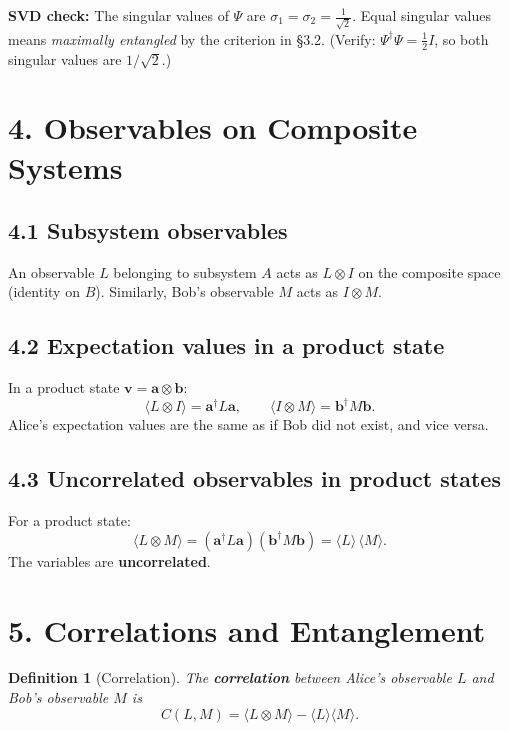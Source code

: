 \documentclass[12pt,a4paper]{article}
\newtheorem{definition}{Definition}
\begin{document}
\textbf{SVD check:}  The singular values of $\Psi$ are $\sigma_1 = \sigma_2 = \frac{1}{\sqrt{2}}$.  Equal singular values means \emph{maximally entangled} by the criterion in \S3.2.  (Verify: $\Psi^\dagger\Psi = \frac{1}{2}I$, so both singular values are $1/\sqrt{2}$.)

\section{4. Observables on Composite Systems}

\subsection{4.1 Subsystem observables}
An observable $L$ belonging to subsystem $A$ acts as $L \otimes I$ on the composite space (identity on $B$).  Similarly, Bob's observable $M$ acts as $I \otimes M$.

\subsection{4.2 Expectation values in a product state}
In a product state $\mathbf{v} = \mathbf{a} \otimes \mathbf{b}$:
\[
    \langle L \otimes I \rangle = \mathbf{a}^\dagger L\mathbf{a}, \qquad
    \langle I \otimes M \rangle = \mathbf{b}^\dagger M\mathbf{b}.
\]
Alice's expectation values are the same as if Bob did not exist, and vice versa.

\subsection{4.3 Uncorrelated observables in product states}
For a product state:
\[
    \langle L \otimes M \rangle = (\mathbf{a}^\dagger L\mathbf{a})(\mathbf{b}^\dagger M\mathbf{b}) = \langle L \rangle\,\langle M \rangle.
\]
The variables are \textbf{uncorrelated}.

\section{5. Correlations and Entanglement}

\begin{definition}[Correlation]
The \textbf{correlation} between Alice's observable $L$ and Bob's observable $M$ is
\[
    C(L,M) = \langle L \otimes M \rangle - \langle L \rangle\langle M \rangle.
\]
\end{definition}
\end{document}
